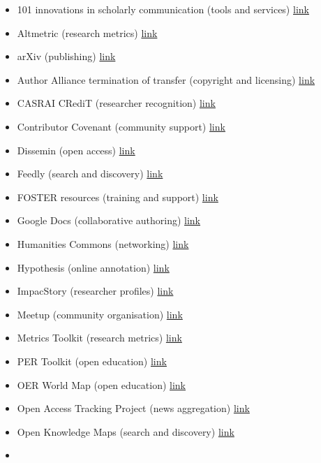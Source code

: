 \begin{itemize}
\item
  101 innovations in scholarly communication (tools and services)
  \href{https://101innovations.wordpress.com/}{link}
\item
  Altmetric (research metrics) \href{https://www.altmetric.com/}{link}
\item
  arXiv (publishing) \href{https://arxiv.org/}{link}
\item
  Author Alliance termination of transfer (copyright and licensing)
  \href{https://www.authorsalliance.org/resources/termination-of-transfer/}{link}
\item
  CASRAI CRediT (researcher recognition)
  \href{http://docs.casrai.org/CRediT}{link}
\item
  Contributor Covenant (community support)
  \href{https://www.contributor-covenant.org/}{link}
\item
  Dissemin (open access) \href{https://dissem.in/}{link}
\item
  Feedly (search and discovery) \href{https://feedly.com/}{link}
\item
  FOSTER resources (training and support)
  \href{https://www.fosteropenscience.eu/resources}{link}
\item
  Google Docs (collaborative authoring)
  \href{https://docs.google.com/}{link}
\item
  Humanities Commons (networking) \href{https://hcommons.org/}{link}
\item
  Hypothesis (online annotation) \href{https://web.hypothes.is/}{link}
\item
  ImpacStory (researcher profiles) \href{http://impactstory.org/}{link}
\item
  Meetup (community organisation) \href{https://www.meetup.com/}{link}
\item
  Metrics Toolkit (research metrics)
  \href{http://www.metrics-toolkit.org/}{link}
\item
  PER Toolkit (open education)
  \href{https://pressbooks.bccampus.ca/facultyoertoolkit/}{link}
\item
  OER World Map (open education)
  \href{https://oerworldmap.org/oerpolicies}{link}
\item
  Open Access Tracking Project (news aggregation)
  \href{https://tagteam.harvard.edu/hubs/oatp/items}{link}
\item
  Open Knowledge Maps (search and discovery)
  \href{https://openknowledgemaps.org/}{link}
\item

\end{itemize}
